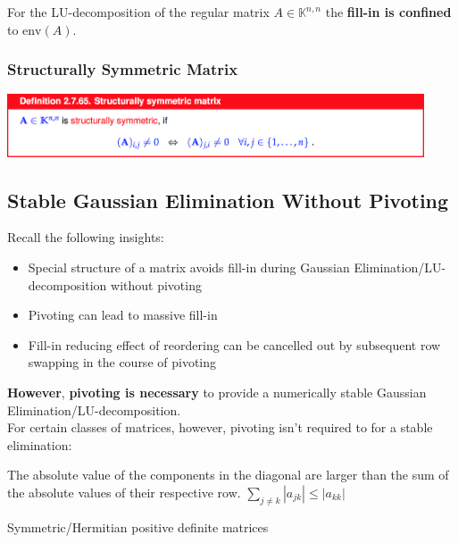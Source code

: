 \documentclass[12pt, a4paper]{article}
\newcommand{\K}{\mathbb{K}}
\begin{document}
For the LU-decomposition of the regular matrix $A \in \K^{n,n}$ the \textbf{fill-in is confined} to $\text{env}(A)$.

\subsubsection{Structurally Symmetric Matrix}

\begin{center}
	\includegraphics[width=350pt]{ssmatrix.png}
\end{center}

\subsection{Stable Gaussian Elimination Without Pivoting}

Recall the following insights:
\begin{itemize}[noitemsep]
	\item Special structure of a matrix avoids fill-in during Gaussian Elimination/LU-decomposition without pivoting
	\item Pivoting can lead to massive fill-in
	\item Fill-in reducing effect of reordering can be cancelled out by subsequent row swapping in the course of pivoting 
\end{itemize}

\textbf{However}, \textbf{pivoting is necessary} to provide a numerically stable Gaussian Elimination/LU-decomposition. \\

For certain classes of matrices, however, pivoting isn't required to for a stable elimination:

\begin{description}[labelindent=16pt,style=multiline,leftmargin=7cm, noitemsep]
	\item[Diagonally Dominant Matrix:] The absolute value of the components in the diagonal are larger than the sum of the absolute values of their respective row. $\sum_{j\neq k}|a_{jk}| \leq |a_{kk}|$
	\item[s.p.d. Matrix:] Symmetric/Hermitian positive definite matrices
\end{description}

\newpage
\end{document}
